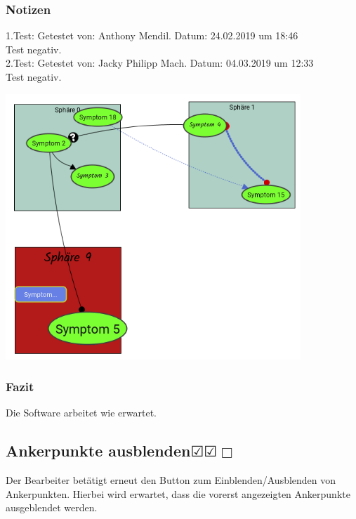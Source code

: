 \documentclass[enabledeprecatedfontcommands]{scrartcl}
\newcommand{\subsectiont}[2]{\subsection[#1]{#1{\normalsize\normalfont #2}}}
\newcommand{\leer}{$\Box$}
\newcommand{\ok}{$\CheckedBox$}
\begin{document}
\subsubsection{Notizen}
1.Test: Getestet von: Anthony Mendil. Datum: 24.02.2019 um 18:46 \\
Test negativ.\\
2.Test: Getestet von: Jacky Philipp Mach. Datum: 04.03.2019 um 12:33 \\
Test negativ.
\begin{center}
\includegraphics[height=10cm]{3_37.PNG}
\end{center}
\subsubsection{Fazit}
Die Software arbeitet wie erwartet.

\subsectiont{Ankerpunkte ausblenden}{\dotfill\ok\ok\leer}
Der Bearbeiter betätigt erneut den Button zum Einblenden/Ausblenden von Ankerpunkten. Hierbei wird erwartet, dass die vorerst angezeigten Ankerpunkte ausgeblendet werden. 
\end{document}
